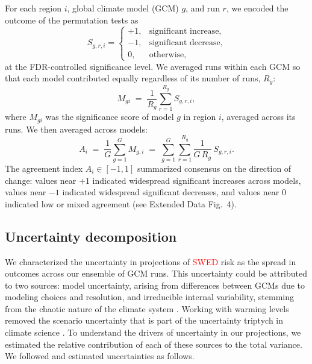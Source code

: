 \documentclass[pdflatex,sn-mathphys-num]{sn-jnl}%
\begin{document}
For each region \(i\), global climate model (GCM) \(g\), and run \(r\), we encoded the outcome of the permutation tests as
\begin{equation}
    S_{g,r,i} =
    \begin{cases}
    +1, & \text{significant increase},\\
    -1, & \text{significant decrease},\\
    0,  & \text{otherwise},
    \end{cases}
\end{equation}
at the FDR-controlled significance level. We averaged runs within each GCM so that each model contributed equally regardless of its number of runs, $R_g$:
\begin{equation}
M_{gi} \;=\; \frac{1}{R_g}\sum_{r=1}^{R_g} S_{g,r,i},
\end{equation}
where $M_{gi}$ was the significance score of model $g$ in region $i$, averaged across its runs. We then averaged across models:
\begin{equation}
A_i \;=\; \frac{1}{G}\sum_{g=1}^{G} M_{g,i}
\;=\; \sum_{g=1}^{G}\sum_{r=1}^{R_g} \frac{1}{G\,R_g}\, S_{g,r,i}.
\end{equation}
The agreement index \(A_i\in[-1,1]\) summarized consensus on the direction of change: values near \(+1\) indicated widespread significant increases across models, values near \(-1\) indicated widespread significant decreases, and values near \(0\) indicated low or mixed agreement (see Extended Data Fig.~4).

\subsection{Uncertainty decomposition}\label{method:uncertainty}

We characterized the uncertainty in projections of \textcolor{red}{SWED} risk as the spread in outcomes across our ensemble of GCM runs. This uncertainty could be attributed to two sources: model uncertainty, arising from differences between GCMs due to modeling choices and resolution, and irreducible internal variability, stemming from the chaotic nature of the climate system \cite{schwarzwaldImportanceInternalClimate2022a, deserUncertaintyClimateChange2012}. Working with warming levels removed the scenario uncertainty that is part of the uncertainty triptych in climate science \cite{hawkinsPotentialNarrowUncertainty2009}. To understand the drivers of uncertainty in our projections, we estimated the relative contribution of each of these sources to the total variance. We followed \cite{lehnerPartitioningClimateProjection2020} and estimated uncertainties as follows.
\end{document}
